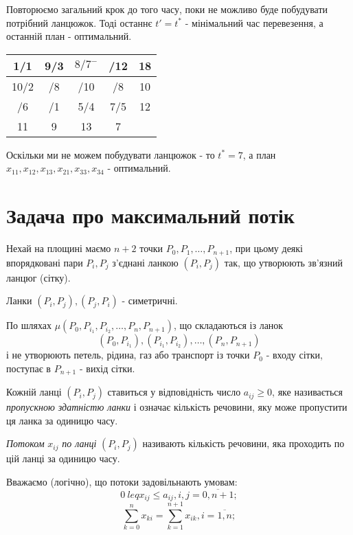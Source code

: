 \documentclass[12pt,a4paper]{book}
\newenvironment{slim_enumerate}{
\begin{enumerate}
  \setlength{\itemsep}{1pt}
  \setlength{\parskip}{0pt}
  \setlength{\parsep}{0pt}}
{\end{enumerate}}
\begin{document}
\begin{slim_enumerate}
Повторюємо загальний крок до того часу, поки не можливо буде побудувати потрібний ланцюжок. Тоді останнє $t'=t^*$ - мінімальний час перевезення, а останній план - оптимальний.\\
\begin{tabular}{ | c | c | c | c | c | }
\hline
1/1	&	9/3	&	$8/7^-$	&\cellcolor[rgb]{0.8,0.8,0.8}	/12	&	18\\
\hline
10/2	&\cellcolor[rgb]{0.8,0.8,0.8}	/8	&\cellcolor[rgb]{0.8,0.8,0.8}	/10	&\cellcolor[rgb]{0.8,0.8,0.8}	/8	&	10\\
\hline
/6	&	/1	&	5/4	&	7/5	&	12\\
\hline
11	&	9	&	13	&	7	&\\
\hline
\end{tabular}

Оскільки ми не можем побудувати ланцюжок - то $t^*=7$, а план $x_{11},x_{12},x_{13},x_{21},x_{33},x_{34}$ - оптимальний.
\end{slim_enumerate}

\section{Задача про максимальний потік}

Нехай на площині маємо $n+2$ точки $P_0, P_1, \dots, P_{n+1}$, при цьому деякі впорядковані пари $P_i, P_j$ з’єднані ланкою $(P_i, P_j)$ так, що утворюють зв’язний ланцюг (сітку).

Ланки $(P_i, P_j), (P_j, P_i)$ - симетричні.

По шляхах $\mu(P_0, P_{i_1}, P_{i_2}, \dots, P_n, P_{n+1})$, що складаються із ланок \[(P_0, P_{i_1}), (P_{i_1}, P_{i_2}), \dots, (P_n, P_{n+1})\] і не утворюють петель, рідина, газ або транспорт із точки $P_0$ - входу сітки, поступає в $P_{n+1}$ - вихід сітки.

Кожній ланці $(P_i, P_j)$ ставиться у відповідність число $a_{ij} \geq 0$, яке називається \emph{пропускною здатністю ланки} і означає кількість речовини, яку може пропустити ця ланка за одиницю часу.

\emph{Потоком} $x_{ij}$ \emph{по ланці} $(P_i, P_j)$ називають кількість речовини, яка проходить по цій ланці за одиницю часу.

Вважаємо (логічно), що потоки задовільнають умовам:
\begin{equation} 0 \ leq x_{ij} \leq a_{ij}, i,j = \overline{0, n+1}; \label{eq:flowvol} \end{equation}
\begin{equation} \sum_{k=0}^n x_{ki} = \sum_{k=1}^{n+1} x_{ik}, i = \overline{1, n}; \label{eq:flowbalance} \end{equation}
\end{document}
